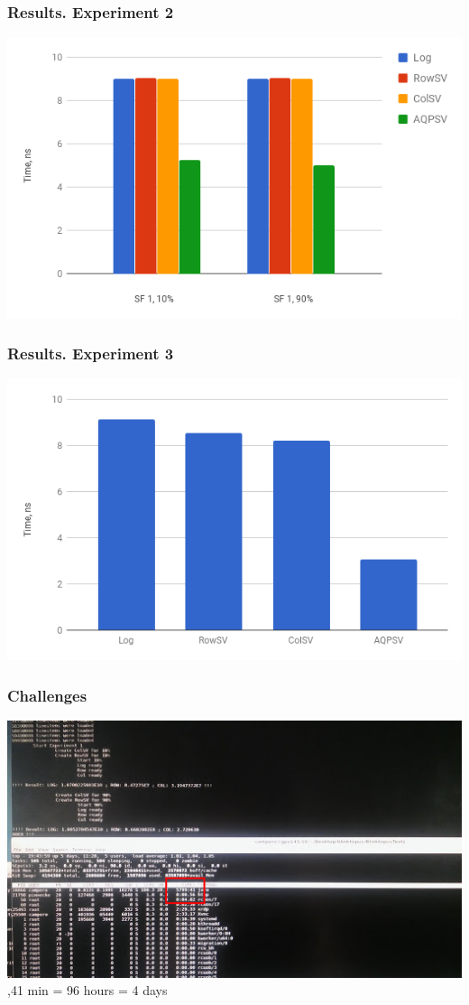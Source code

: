 \documentclass{beamer}
\begin{document}
\begin{frame}
\frametitle{Results. Experiment 2}
\centering
\includegraphics[scale=0.5]{img/exp2.png}
\end{frame}

\begin{frame}
\frametitle{Results. Experiment 3}
\centering
\includegraphics[scale=0.5]{img/exp3.png}
\end{frame}

\begin{frame}
\frametitle{Challenges} \pause
\centering
\includegraphics[scale=0.5]{img/beast.jpg} \\ ,41 min = 96 hours = 4 days
\end{frame}
\end{document}
